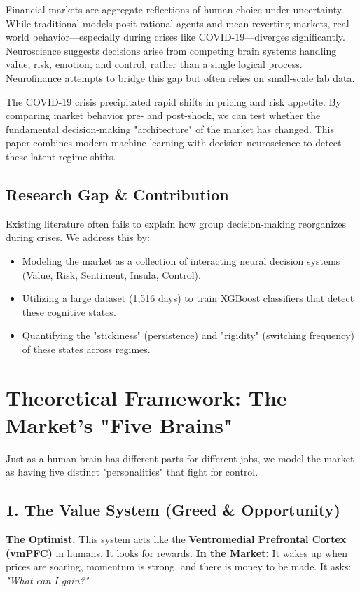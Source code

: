 \documentclass[12pt, oneside]{article}
\begin{document}
Financial markets are aggregate reflections of human choice under uncertainty. While traditional models posit rational agents and mean-reverting markets, real-world behavior—especially during crises like COVID-19—diverges significantly. Neuroscience suggests decisions arise from competing brain systems handling value, risk, emotion, and control, rather than a single logical process. Neurofinance attempts to bridge this gap but often relies on small-scale lab data.

The COVID-19 crisis precipitated rapid shifts in pricing and risk appetite. By comparing market behavior pre- and post-shock, we can test whether the fundamental decision-making "architecture" of the market has changed. This paper combines modern machine learning with decision neuroscience to detect these latent regime shifts.

\subsection{Research Gap \& Contribution}
Existing literature often fails to explain how group decision-making reorganizes during crises. We address this by:
\begin{itemize}
    \item Modeling the market as a collection of interacting neural decision systems (Value, Risk, Sentiment, Insula, Control).
    \item Utilizing a large dataset (1,516 days) to train XGBoost classifiers that detect these cognitive states.
    \item Quantifying the "stickiness" (persistence) and "rigidity" (switching frequency) of these states across regimes.
\end{itemize}

\section{Theoretical Framework: The Market's "Five Brains"}

Just as a human brain has different parts for different jobs, we model the market as having five distinct "personalities" that fight for control.

\subsection{1. The Value System (Greed \& Opportunity)}
\textbf{The Optimist.} This system acts like the \textbf{Ventromedial Prefrontal Cortex (vmPFC)} in humans. It looks for rewards.
\textbf{In the Market:} It wakes up when prices are soaring, momentum is strong, and there is money to be made. It asks: \textit{"What can I gain?"}
\end{document}
